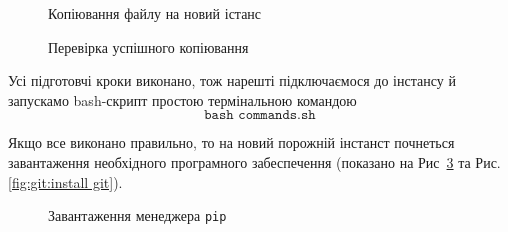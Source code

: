 \documentclass[a4paper,14pt]{extarticle} %
\begin{document}
\begin{figure}[H]
    \caption{Копіювання файлу на новий істанс}
    \label{fig:git:copy file}
\end{figure}

\begin{figure}[H]
    \caption{Перевірка успішного копіювання}
    \label{fig:git:check file}
\end{figure}

Усі підготовчі кроки виконано, тож нарешті підключаємося до інстансу й запускамо bash-скрипт простою 
термінальною командою
\[ \texttt{bash commands.sh} \]

Якщо все виконано правильно, то на новий порожній інстанст почнеться завантаження необхідного програмного 
забеспечення (показано на Рис~\ref{fig:git:install pip} та Рис. \ref{fig:git:install git}).

\begin{figure}[H]
    \caption{Завантаження менеджера \texttt{pip}}
    \label{fig:git:install pip}
\end{figure}
\end{document}
